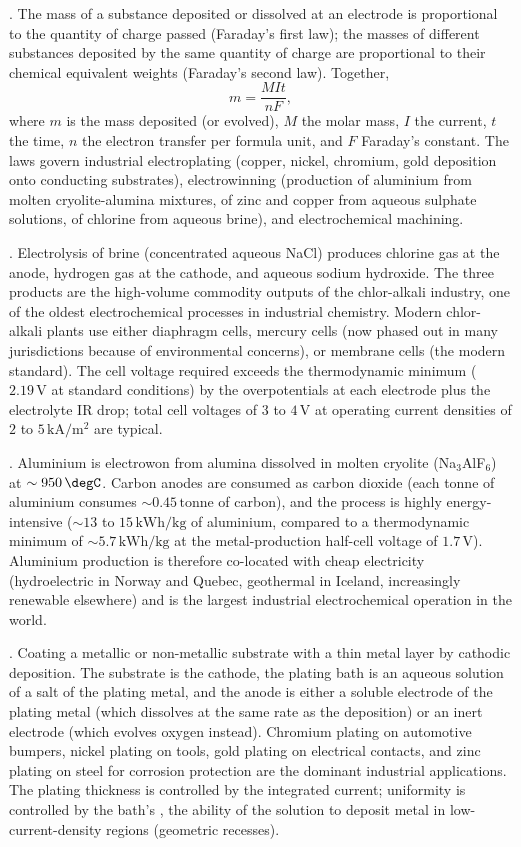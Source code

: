 . The mass of a substance
deposited or dissolved at an electrode is proportional to the
quantity of charge passed (Faraday's first law); the masses of
different substances deposited by the same quantity of charge are
proportional to their chemical equivalent weights (Faraday's second
law). Together,
\[
m = \frac{M I t}{n F},
\]
where $m$ is the mass deposited (or evolved), $M$ the molar mass, $I$
the current, $t$ the time, $n$ the electron transfer per formula unit,
and $F$ Faraday's constant. The laws govern industrial electroplating
(copper, nickel, chromium, gold deposition onto conducting substrates),
electrowinning (production of aluminium from molten cryolite-alumina
mixtures, of zinc and copper from aqueous sulphate solutions, of
chlorine from aqueous brine), and electrochemical machining.

. Electrolysis of brine (concentrated
aqueous NaCl) produces chlorine gas at the anode, hydrogen gas at the
cathode, and aqueous sodium hydroxide. The three products are the
high-volume commodity outputs of the chlor-alkali industry, one of the
oldest electrochemical processes in industrial chemistry. Modern
chlor-alkali plants use either diaphragm cells, mercury cells (now
phased out in many jurisdictions because of environmental concerns),
or membrane cells (the modern standard). The cell voltage required
exceeds the thermodynamic minimum ($2.19\,\text{V}$ at standard
conditions) by the overpotentials at each electrode plus the
electrolyte IR drop; total cell voltages of $3$ to $4\,\text{V}$ at
operating current densities of $2$ to $5\,\text{kA}/\text{m}^2$ are
typical.

. Aluminium is electrowon from
alumina dissolved in molten cryolite (Na$_3$AlF$_6$) at $\sim 950\,
\degC$. Carbon anodes are consumed as carbon dioxide (each tonne of
aluminium consumes $\sim 0.45\,\text{tonne}$ of carbon), and the
process is highly energy-intensive ($\sim 13$ to $15\,\text{kWh}/
\text{kg}$ of aluminium, compared to a thermodynamic minimum of
$\sim 5.7\,\text{kWh}/\text{kg}$ at the metal-production half-cell
voltage of $1.7\,\text{V}$). Aluminium production is therefore
co-located with cheap electricity (hydroelectric in Norway and
Quebec, geothermal in Iceland, increasingly renewable elsewhere) and
is the largest industrial electrochemical operation in the world.

. Coating a metallic or non-metallic substrate
with a thin metal layer by cathodic deposition. The substrate is the
cathode, the plating bath is an aqueous solution of a salt of the
plating metal, and the anode is either a soluble electrode of the
plating metal (which dissolves at the same rate as the deposition) or
an inert electrode (which evolves oxygen instead). Chromium plating
on automotive bumpers, nickel plating on tools, gold plating on
electrical contacts, and zinc plating on steel for corrosion
protection are the dominant industrial applications. The plating
thickness is controlled by the integrated current; uniformity is
controlled by the bath's , the ability of the
solution to deposit metal in low-current-density regions (geometric
recesses).


